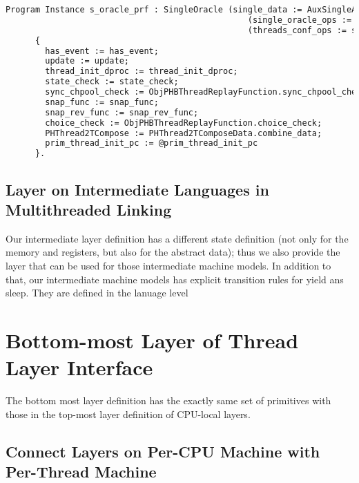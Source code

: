 \begin{lstlisting}[language=Caml]
    Program Instance s_oracle_prf : SingleOracle (single_data := AuxSingleAbstractDataType.single_data) 
                                                 (single_oracle_ops := s_oracle_ops) 
                                                 (threads_conf_ops := s_threads_ops):=
      { 
        has_event := has_event;
        update := update;
        thread_init_dproc := thread_init_dproc;
        state_check := state_check;
        sync_chpool_check := ObjPHBThreadReplayFunction.sync_chpool_check;
        snap_func := snap_func;
        snap_rev_func := snap_rev_func;
        choice_check := ObjPHBThreadReplayFunction.choice_check;
        PHThread2TCompose := PHThread2TComposeData.combine_data;
        prim_thread_init_pc := @prim_thread_init_pc
      }.
\end{lstlisting}

\subsection{Layer on Intermediate Languages in Multithreaded Linking}
\label{chapter:certikos:subsec:layer-on-intermediate-languages-in-multithreaded-linking}

Our intermediate layer definition has a different state definition (not only for the memory and registers, but also for the abstract data); thus we also provide the 
layer that can be used for those intermediate machine models. 
In addition to that, our intermediate machine models has explicit 
transition rules for yield ans sleep. 
They are defined in the lanuage level 


\section{Bottom-most Layer of Thread Layer Interface}
\label{chapter:certikos:subsec:phthread}

The bottom most layer definition has the exactly same set of primitives with those in 
the top-most layer definition of CPU-local layers. 



\subsection{Connect Layers on Per-CPU Machine with Per-Thread Machine}
\label{chapter:certikos:subsec:multithreaded-connect}

